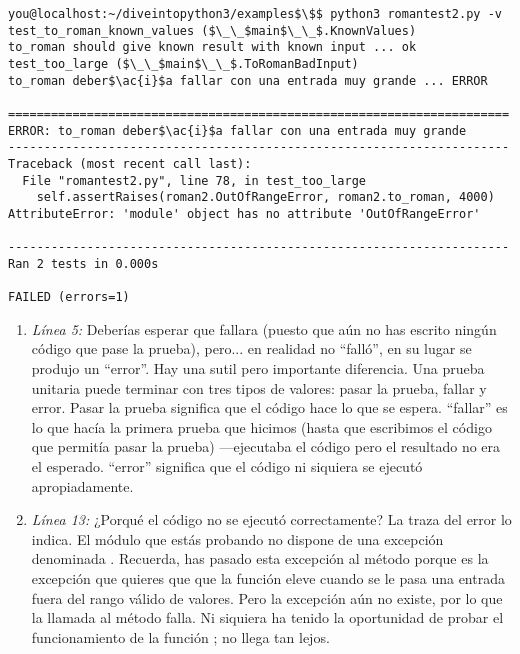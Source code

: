 \noindent\begin{minipage}{\textwidth}
\begin{lstlisting}[mathescape=True]
you@localhost:~/diveintopython3/examples$\$$ python3 romantest2.py -v
test_to_roman_known_values ($\_\_$main$\_\_$.KnownValues)
to_roman should give known result with known input ... ok
test_too_large ($\_\_$main$\_\_$.ToRomanBadInput)
to_roman deber$\ac{i}$a fallar con una entrada muy grande ... ERROR

======================================================================
ERROR: to_roman deber$\ac{i}$a fallar con una entrada muy grande
----------------------------------------------------------------------
Traceback (most recent call last):
  File "romantest2.py", line 78, in test_too_large
    self.assertRaises(roman2.OutOfRangeError, roman2.to_roman, 4000)
AttributeError: 'module' object has no attribute 'OutOfRangeError'

----------------------------------------------------------------------
Ran 2 tests in 0.000s

FAILED (errors=1)
\end{lstlisting}
\end{minipage}

\begin{enumerate}

\item \emph{Línea 5:} Deberías esperar que fallara (puesto que aún no has escrito ningún código que pase la prueba), pero... en realidad no ``falló'', en su lugar se produjo un ``error''. Hay una sutil pero importante diferencia. Una prueba unitaria puede terminar con tres tipos de valores: pasar la prueba, fallar y error. Pasar la prueba significa que el código hace lo que se espera. ``fallar'' es lo que hacía la primera prueba que hicimos (hasta que escribimos el código que permitía pasar la prueba) ---ejecutaba el código pero el resultado no era el esperado. ``error'' significa que el código ni siquiera se ejecutó apropiadamente.

\item \emph{Línea 13:} ¿Porqué el código no se ejecutó correctamente? La traza del error lo indica. El módulo que estás probando no dispone de una excepción denominada . Recuerda, has pasado esta excepción al método  porque es la excepción que quieres que que la función eleve cuando se le pasa una entrada fuera del rango válido de valores. Pero la excepción aún no existe, por lo que la llamada al método  falla. Ni siquiera ha tenido la oportunidad de probar el funcionamiento de la función ; no llega tan lejos.

\end{enumerate}

